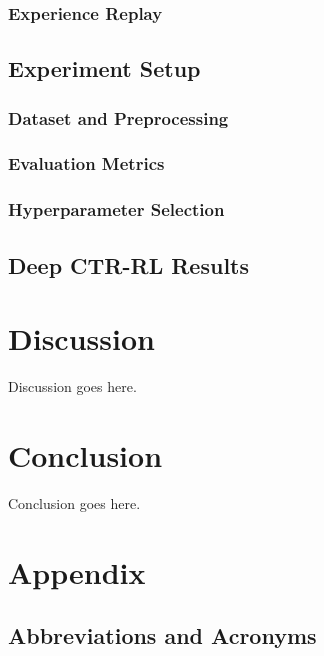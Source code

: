 \documentclass{mldsmsc}
\begin{document}
\subsection{Experience Replay}

\section{Experiment Setup}

\subsection{Dataset and Preprocessing}

\subsection{Evaluation Metrics}

\subsection{Hyperparameter Selection}

\section{Deep CTR-RL Results}

\chapter{Discussion}
\label{chap:discussion}

Discussion goes here.

\chapter{Conclusion}


Conclusion goes here. 





\clearpage
\renewcommand*{\thepage}{A\arabic{page}}

\appendix
%
\chapter{Appendix}

\section{Abbreviations and Acronyms}
\label{app:acronyms}
\end{document}
